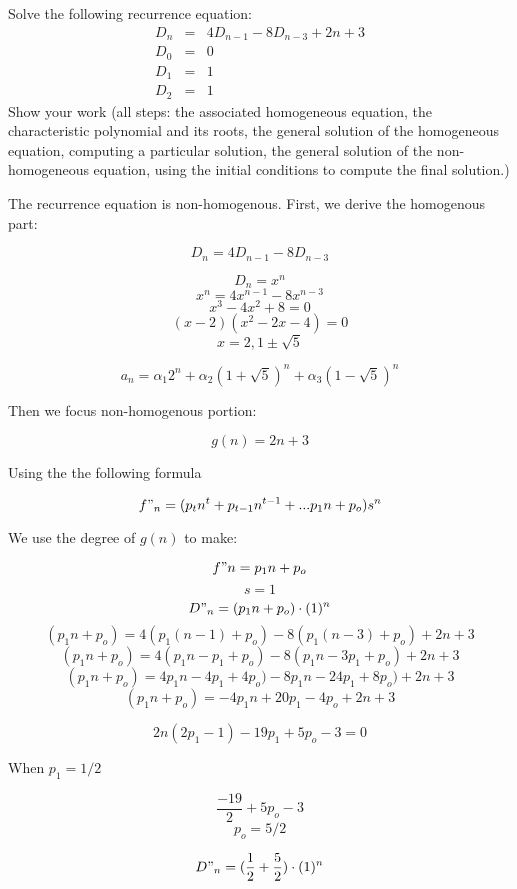 
\begin{problem}
Solve the following recurrence equation:
%
\begin{eqnarray*}
        D_n &=& 4D_{n-1} -8 D_{n-3} + 2n+3\\
        D_0 &=& 0 \\
        D_1 &=& 1 \\
		D_2 &=& 1
\end{eqnarray*}
%
Show your work (all steps: the associated homogeneous equation,
the characteristic polynomial and its
roots, the general solution of the homogeneous
equation, computing a particular solution,
the general solution of the non-homogeneous equation,
using the initial conditions to compute the final solution.)
\end{problem}

\begin{solution}

The recurrence equation is non-homogenous. First, we derive the homogenous part:

\[ D_{n} = 4D_{n-1} - 8D_{n-3} \]

\[ D_{n} = x^{n} \]
\[ x^{n} = 4x^{n-1} - 8x^{n-3} \]
\[ x^{3} - 4x^{2} + 8 = 0 \]
\[ (x-2)(x^{2} - 2x - 4) = 0 \]
\[ x = 2, 1 \pm \sqrt{5} \]

\[ a_{n} = \alpha_{1}2^{n} + \alpha_{2}(1 + \sqrt{5})^{n} + \alpha_{3}(1 - \sqrt{5})^{n} \]  

Then we focus non-homogenous portion:

\[ g(n) = 2n + 3 \]

Using the the following formula

\[ f"_{n} = (p_{t}n^{t} + p_{t-1}n^{t-1} + ... p_{1}n + p_{o} ) s^{n} \]

We use the degree of $g(n)$ to make:

\[ f"n = p_{1}n + p_{o} \]
\[ s = 1 \]
\[ D"_{n} = (p_{1}n + p_{o}) \cdot (1)^{n} \]
\[ (p_{1}n + p_{o}) = 4(p_{1}(n-1) + p_{o}) - 8(p_{1}(n-3) + p_{o}) + 2n + 3 \]
\[ (p_{1}n + p_{o}) = 4(p_{1}n - p_{1} + p_{o}) - 8(p_{1}n - 3p_{1} + p_{o}) + 2n + 3 \]
\[ (p_{1}n + p_{o}) = 4p_{1}n - 4p_{1} + 4p_{o}) - 8p_{1}n - 24p_{1} + 8p_{o}) + 2n + 3 \]
\[ (p_{1}n + p_{o}) = -4p_{1}n + 20p_{1} - 4p_{o} + 2n + 3 \]

\[ 2n(2p_{1} - 1) - 19p_{1} + 5p_{o} - 3 = 0 \]

When $p_{1} = 1/2$

\[ \frac{-19}{2} + 5p_{o} - 3 \]
\[ p_{o} = 5/2 \]

\[ D"_{n} = ( \frac{1}{2} + \frac{5}{2}) \cdot (1)^{n} \]


\end{solution}
